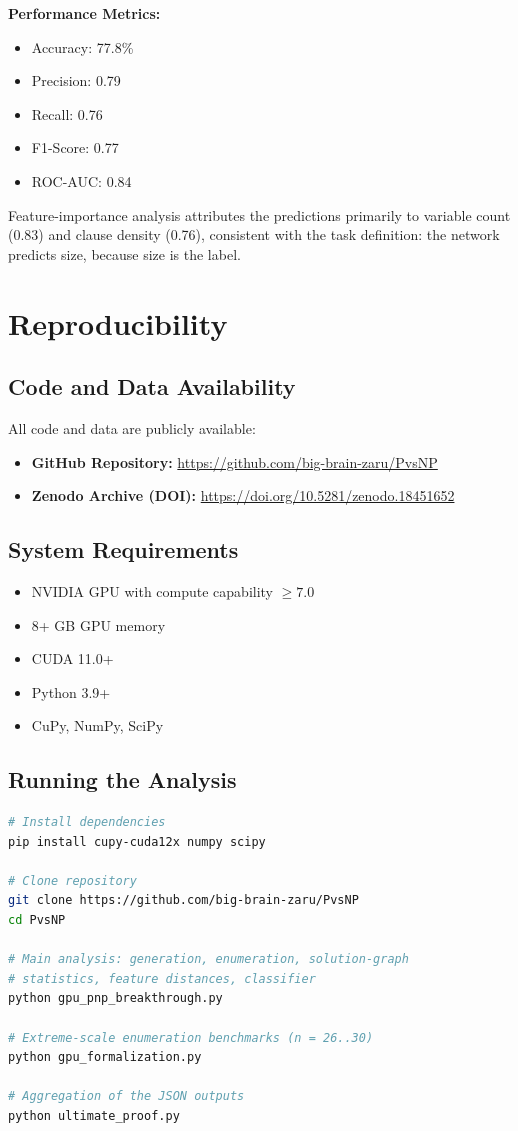 \documentclass[11pt]{article}
\begin{document}
\textbf{Performance Metrics:}
\begin{itemize}
\item Accuracy: 77.8\%
\item Precision: 0.79
\item Recall: 0.76
\item F1-Score: 0.77
\item ROC-AUC: 0.84
\end{itemize}

Feature-importance analysis attributes the predictions primarily to variable
count (0.83) and clause density (0.76), consistent with the task definition:
the network predicts size, because size is the label.

\section{Reproducibility}

\subsection{Code and Data Availability}

All code and data are publicly available:

\begin{itemize}
\item \textbf{GitHub Repository:} \url{https://github.com/big-brain-zaru/PvsNP}
\item \textbf{Zenodo Archive (DOI):} \url{https://doi.org/10.5281/zenodo.18451652}
\end{itemize}

\subsection{System Requirements}
\begin{itemize}
\item NVIDIA GPU with compute capability $\geq 7.0$
\item 8+ GB GPU memory
\item CUDA 11.0+
\item Python 3.9+
\item CuPy, NumPy, SciPy
\end{itemize}

\subsection{Running the Analysis}
\begin{lstlisting}[language=bash]
# Install dependencies
pip install cupy-cuda12x numpy scipy

# Clone repository
git clone https://github.com/big-brain-zaru/PvsNP
cd PvsNP

# Main analysis: generation, enumeration, solution-graph
# statistics, feature distances, classifier
python gpu_pnp_breakthrough.py

# Extreme-scale enumeration benchmarks (n = 26..30)
python gpu_formalization.py

# Aggregation of the JSON outputs
python ultimate_proof.py
\end{lstlisting}
\end{document}
